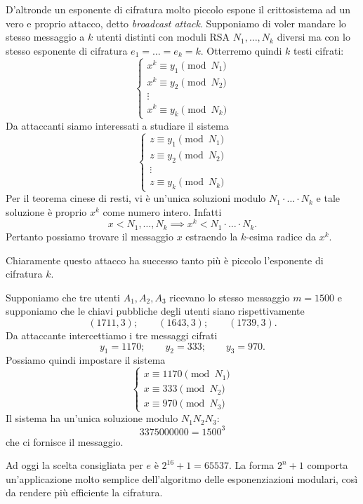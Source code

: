 	D'altronde un esponente di cifratura molto piccolo espone il crittosistema ad un vero e proprio attacco, detto \emph{broadcast attack}.
	Supponiamo di voler mandare lo stesso messaggio a \(k\) utenti distinti con moduli RSA \(N_1,\ldots,N_k\) diversi ma con lo stesso esponente di cifratura \(e_1= \ldots = e_k = k\).
	Otterremo quindi \(k\) testi cifrati:
		\[
		\begin{cases}
		x^k \equiv y_1 \pmod{N_1}\\
		x^k \equiv y_2 \pmod{N_2}\\
		\vdots\\
		x^k \equiv y_k \pmod{N_k}
		\end{cases}
		\]
	Da attaccanti siamo interessati a studiare il sistema
		\[
		\begin{cases}
		z \equiv y_1 \pmod{N_1}\\
		z \equiv y_2 \pmod{N_2}\\
		\vdots\\
		z \equiv y_k \pmod{N_k}
		\end{cases}		
		\]
	Per il teorema cinese di resti, vi è un'unica soluzioni modulo \(N_1 \cdot\ldots\cdot N_k\) e tale soluzione è proprio \(x^k\) come numero intero. Infatti
		\[
		x < N_1, \ldots, N_k \implies x^k < N_1 \cdot\ldots\cdot N_k.
		\]
	Pertanto possiamo trovare il messaggio \(x\) estraendo la \(k\)-esima radice da \(x^k\).

	Chiaramente questo attacco ha successo tanto più è piccolo l'esponente di cifratura \(k\).

	\begin{ese}
	Supponiamo che tre utenti \(A_1,A_2,A_3\) ricevano lo stesso messaggio \(m=1500\) e supponiamo che le chiavi pubbliche degli utenti siano rispettivamente
		\[
		(1711,3); \qquad (1643,3); \qquad (1739,3).
		\]
	Da attaccante intercettiamo i tre messaggi cifrati
		\[
		y_1 = 1170; \qquad y_2 = 333; \qquad y_3 = 970.
		\]
	Possiamo quindi impostare il sistema
		\[
		\begin{cases}
		x \equiv 1170 \pmod{N_1}\\
		x \equiv 333 \pmod{N_2}\\
		x \equiv 970 \pmod{N_3}
		\end{cases}
		\]
	Il sistema ha un'unica soluzione modulo \(N_1 N_2 N_3\):
		\[
		3375000000 = 1500^3
		\]
	che ci fornisce il messaggio.
	\end{ese}

	Ad oggi la scelta consigliata per \(e\) è \(2^{16}+1=65537\).
	La forma \(2^n+1\) comporta un'applicazione molto semplice dell'algoritmo delle esponenziazioni modulari, così da rendere più efficiente la cifratura.

